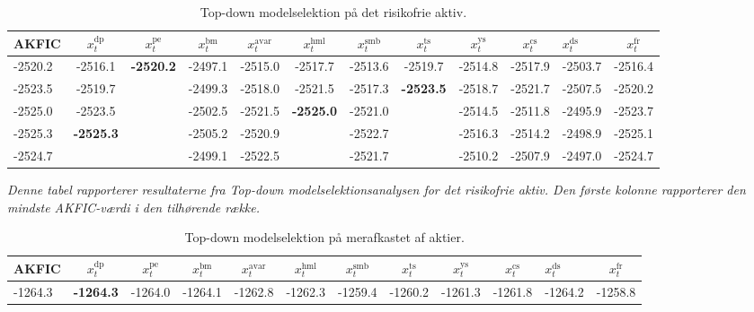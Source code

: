 \documentclass[
  a4paper,
  oneside]{memoir}
\begin{document}
\begin{landscape}
\begin{table}[H]

\caption{\label{tab:STEP-RF-TABLE}Top-down modelselektion på det risikofrie aktiv.}
\centering
\begin{threeparttable}
\begin{tabular}[t]{lccccccccclc}
\toprule
AKFIC & $x_t^{\text{dp}}$ & $x_t^{\text{pe}}$ & $x_t^{\text{bm}}$ & $x_t^{\text{avar}}$ & $x_t^{\text{hml}}$ & $x_t^{\text{smb}}$ & $x_t^{\text{ts}}$ & $x_t^{\text{ys}}$ & $x_t^{\text{cs}}$ & $x_t^{\text{ds}}$ & $x_t^{\text{fr}}$\\
\midrule
\rowcolor{gray!6}  -2520.2 & -2516.1 & \textbf{-2520.2} & -2497.1 & -2515.0 & -2517.7 & -2513.6 & -2519.7 & -2514.8 & -2517.9 & -2503.7 & -2516.4\\
 
-2523.5 & -2519.7 &  & -2499.3 & -2518.0 & -2521.5 & -2517.3 & \textbf{-2523.5} & -2518.7 & -2521.7 & -2507.5 & -2520.2\\
 
\rowcolor{gray!6}  -2525.0 & -2523.5 &  & -2502.5 & -2521.5 & \textbf{-2525.0} & -2521.0 &  & -2514.5 & -2511.8 & -2495.9 & -2523.7\\
 
-2525.3 & \textbf{-2525.3} &  & -2505.2 & -2520.9 &  & -2522.7 &  & -2516.3 & -2514.2 & -2498.9 & -2525.1\\
 
\rowcolor{gray!6}  -2524.7 &  &  & -2499.1 & -2522.5 &  & -2521.7 &  & -2510.2 & -2507.9 & -2497.0 & -2524.7\\
\bottomrule
\end{tabular}
\begin{tablenotes}
\item \textit{Denne tabel rapporterer resultaterne fra \textit{Top-down} modelselektionsanalysen for det risikofrie aktiv. Den første kolonne rapporterer den mindste AKFIC-værdi i den tilhørende række.}
\end{tablenotes}
\end{threeparttable}
\end{table}

\begin{table}[H]

\caption{\label{tab:STEP-AKT-TABLE}Top-down modelselektion på merafkastet af aktier.}
\centering
\begin{threeparttable}
\begin{tabular}[t]{lccccccccclc}
\toprule
AKFIC & $x_t^{\text{dp}}$ & $x_t^{\text{pe}}$ & $x_t^{\text{bm}}$ & $x_t^{\text{avar}}$ & $x_t^{\text{hml}}$ & $x_t^{\text{smb}}$ & $x_t^{\text{ts}}$ & $x_t^{\text{ys}}$ & $x_t^{\text{cs}}$ & $x_t^{\text{ds}}$ & $x_t^{\text{fr}}$\\
\midrule
\rowcolor{gray!6}  -1264.3 & \textbf{-1264.3} & -1264.0 & -1264.1 & -1262.8 & -1262.3 & -1259.4 & -1260.2 & -1261.3 & -1261.8 & -1264.2 & -1258.8\\
 

\end{tabular}
\end{threeparttable}
\end{table}
\end{landscape}
\end{document}
